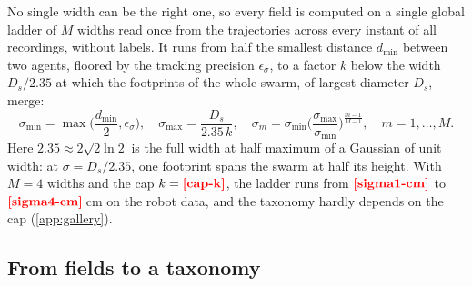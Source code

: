 \documentclass[pdflatex,sn-apa]{sn-jnl}
\begin{document}
No single width can be the right one, so every field is computed on a single global ladder of $M$ widths read once from
the trajectories across every instant of all recordings, without labels. It runs from half the smallest distance
$d_{\min}$ between two agents, floored by the tracking precision $\epsilon_\sigma$, to a factor $k$ below the width
$D_s/2.35$ at which the footprints of the whole swarm, of largest diameter $D_s$, merge:
\begin{equation}
\sigma_{\min}=\max\!\Big(\frac{d_{\min}}{2},\epsilon_\sigma\Big),\quad
\sigma_{\max}=\frac{D_s}{2.35\,k},\quad
\sigma_m=\sigma_{\min}\Big(\frac{\sigma_{\max}}{\sigma_{\min}}\Big)^{\frac{m-1}{M-1}},\quad m=1,\dots,M.
\label{eq:ladder}
\end{equation}
Here $2.35\approx2\sqrt{2\ln2}$ is the full width at half maximum of a Gaussian of unit width: at $\sigma=D_s/2.35$, one
footprint spans the swarm at half its height. With $M=4$ widths and the cap $k=\nm{cap-k}$, the ladder runs from $\nm{sigma1-cm}$ to $\nm{sigma4-cm}$\,cm on the robot
data, and the taxonomy hardly depends on the cap (\cref{app:gallery}).

\subsection{From fields to a taxonomy}
\label{sec:from_fields}\label{sec:seeds}\label{sec:distances}\label{sec:fusion}\label{sec:ap}\label{sec:differentiability}
\end{document}

